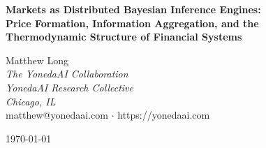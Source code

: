 \documentclass[12pt,a4paper]{article}
\theoremstyle{definition}
\begin{document}

\begin{center}
{\LARGE\bfseries Markets as Distributed Bayesian Inference Engines:\\[6pt]
Price Formation, Information Aggregation, and the\\[4pt]
Thermodynamic Structure of Financial Systems}

\vspace{1.2cm}

{\large Matthew Long}\\[4pt]
{\itshape The YonedaAI Collaboration}\\
{\itshape YonedaAI Research Collective}\\
{\itshape Chicago, IL}\\[4pt]
{\ttfamily matthew@yonedaai.com} $\cdot$ {\ttfamily https://yonedaai.com}

\vspace{0.8cm}

\today

\vspace{0.6cm}

\end{center}
\end{document}

